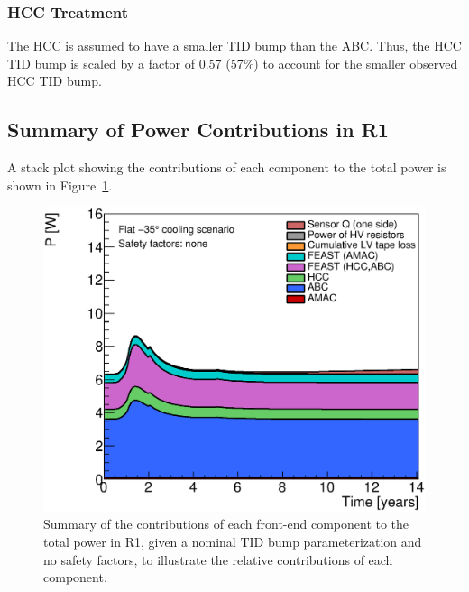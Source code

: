 
\subsubsection*{HCC Treatment}

The HCC is assumed to have a smaller TID bump than the ABC. Thus, the HCC TID bump
is scaled by a factor of 0.57 (57\%) to account for the smaller observed HCC TID bump.

\subsection{Summary of Power Contributions in R1}

A stack plot showing the contributions of each component to the total power is shown in
Figure~\ref{power_stackplot}.

\begin{figure}[ht!]
\begin{center}
\includegraphics[width=0.59\linewidth]{figures/PowerStackPlot.eps}
\end{center}
\caption{Summary of the contributions of each front-end component to the total power in R1, given
a nominal TID bump parameterization and no safety factors, to illustrate the relative contributions
of each component.}
\label{power_stackplot}
\end{figure}

